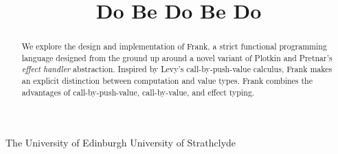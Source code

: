 \documentclass[preprint]{sigplanconf}
\begin{document}


\title{Do Be Do Be Do}

           {The University of Edinburgh}
           {}
           {University of Strathclyde}
           {}

\maketitle



\begin{abstract}
We explore the design and implementation of Frank, a strict functional
programming language designed from the ground up around a novel variant of
Plotkin and Pretnar's \emph{effect handler} abstraction.
%
Inspired by Levy's call-by-push-value calculus, Frank makes an
explicit distinction between computation and value types. Frank
combines the advantages of call-by-push-value, call-by-value, and
effect typing.

\end{abstract}
\end{document}
